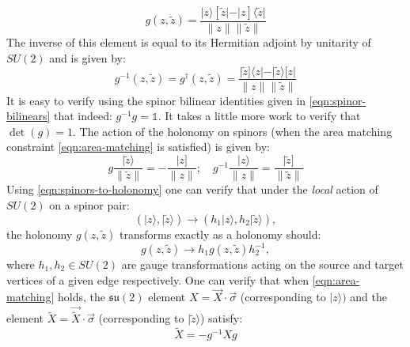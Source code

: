 \documentclass[twocolumn,final,aps,nofootinbib,nobibnotes]{revtex4-2}
\newcommand{\mf}[1]{\mathfrak{#1}}
\newcommand{\id}{\mathbb{1}}
\newcommand{\bra}[1]{\langle #1 \vert}
\newcommand{\ket}[1]{\vert #1 \rangle}
\newcommand{\norm}[1]{\lVert #1 \rVert}
\newcommand{\rket}[1]{\vert #1 ]}
\newcommand{\rbra}[1]{[ #1 \vert}
\begin{document}
\begin{equation}
	g(z,\tilde z) = \frac{\ket{z}\rbra{\tilde z} - \rket{z}\bra{\tilde z}}{\norm{z} \norm{\tilde z}}
\end{equation}
The inverse of this element is equal to its Hermitian adjoint by unitarity of $ SU(2) $ and is given by:
\begin{equation}\label{eqn:holonomy-inverse}
	g^{-1}(z, \tilde z) = g^\dag(z, \tilde z) = \frac{\rket{\tilde z}\bra{z} - \ket{\tilde z}\rbra{z}}{\norm{z} \norm{\tilde z}}
\end{equation}
It is easy to verify using the spinor bilinear identities given in \eqref{eqn:spinor-bilinears} that indeed: $ g^{-1} g = \id $. It takes a little more work to verify that $ \det(g) = 1 $. The action of the holonomy on spinors (when the area matching constraint \eqref{eqn:area-matching} is satisfied) is given by:
\begin{equation}\label{eqn:holonomy-action}
	g \frac{\ket{\tilde z}}{\norm{\tilde z}} = -\frac{\rket{z}}{\norm{z}}; \quad g^{-1} \frac{\ket{z}}{\norm{z}} = \frac{\rket{\tilde z}}{\norm{\tilde z}}
\end{equation}
Using \eqref{eqn:spinors-to-holonomy} one can verify that under the \textit{local} action of $ SU(2) $ on a spinor pair:
\begin{equation}\label{eqn:su2-spinor-action}
	(\ket{z}, \ket{\tilde z}) \rightarrow (h_1 \ket{z}, h_2 \ket{\tilde z}),
\end{equation}
the holonomy $ g(z, \tilde z) $ transforms exactly as a holonomy should:
\begin{equation}\label{eqn:su2-holonomy-action}
	g(z, \tilde z) \rightarrow h_1 g(z, \tilde z) h_2^{-1},
\end{equation}
where $ h_1, h_2 \in SU(2) $ are gauge transformations acting on the source and target vertices of a given edge respectively. One can verify that when \eqref{eqn:area-matching} holds, the $ \mf{su}(2) $ element $ X = \vec{X}\cdot\vec{\sigma} $ (corresponding to $ \ket{z}) $ and the element $ \tilde{X} = \vec{\tilde X}\cdot\vec{\sigma} $ (corresponding to $ \ket{\tilde z} $) satisfy:
\begin{equation}\label{eqn:3-vecs-relation}
	\tilde X = -g^{-1} X g
\end{equation}

%

%

%



%



\end{document}
